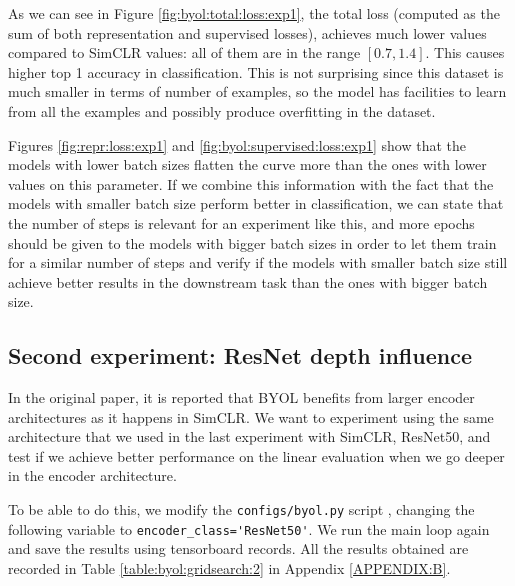 As we can see in Figure \ref{fig:byol:total:loss:exp1}, the total loss (computed as the sum of both representation and supervised losses), achieves much lower values compared to SimCLR values: all of them are in the range $[0.7,1.4]$. This causes higher top 1 accuracy in classification. This is not surprising since this dataset is much smaller in terms of number of examples, so the model has facilities to learn from all the examples and possibly produce overfitting in the dataset.

Figures \ref{fig:repr:loss:exp1} and \ref{fig:byol:supervised:loss:exp1} show that the models with lower batch sizes flatten the curve more than the ones with lower values on this parameter. If we combine this information with the fact that the models with smaller batch size perform better in classification, we can state that the number of steps is relevant for an experiment like this, and more epochs should be given to the models with bigger batch sizes in order to let them train for a similar number of steps and verify if the models with smaller batch size still achieve better results in the downstream task than the ones with bigger batch size.


\subsection{Second experiment: ResNet depth influence}
\label{byol:second:experiment}

In the original paper, it is reported that BYOL benefits from larger encoder architectures as it happens in SimCLR. We want to experiment using the same architecture that we used in the last experiment with SimCLR, ResNet50, and test if we achieve better performance on the linear evaluation when we go deeper in the encoder architecture.

To be able to do this, we modify the \lstinline{configs/byol.py} script , changing the following variable to \lstinline{encoder_class='ResNet50'}. We run the main loop again and save the results using tensorboard records. All the results obtained are recorded in Table \ref{table:byol:gridsearch:2} in Appendix \ref{APPENDIX:B}.

